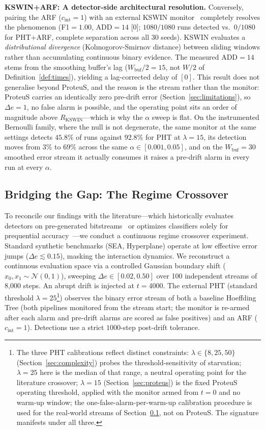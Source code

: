 \documentclass[smallextended]{svjour3}
\begin{document}
\textbf{KSWIN+ARF: A detector-side architectural resolution.}
Conversely, pairing the ARF ($c_{\mathrm{int}}=1$) with an external KSWIN monitor~\cite{raab_kswin_2020} completely resolves the phenomenon (F1${=}1.00$, ADD${=}14$ [0]; $1080/1080$ runs detected vs.\ $0/1080$ for PHT$+$ARF, complete separation across all 30 seeds). KSWIN evaluates a \emph{distributional divergence} (Kolmogorov-Smirnov distance) between sliding windows rather than accumulating continuous binary evidence. The measured ADD${=}14$ stems from the smoothing buffer's lag ($W_{\mathrm{buf}}/2=15$, not $W/2$ of Definition~\ref{def:times}), yielding a lag-corrected delay of $[0]$. This result does not generalise beyond ProteuS, and the reason is the stream rather than the monitor: ProteuS carries an identically zero pre-drift error (Section~\ref{sec:limitations}), so $\Delta e = 1$, no false alarm is possible, and the operating point sits an order of magnitude above $R_{\mathrm{KSWIN}}$---which is why the $\alpha$ sweep is flat. On the instrumented Bernoulli family, where the null is not degenerate, the same monitor at the same settings detects $45.8\%$ of runs against $92.8\%$ for PHT at $\lambda{=}15$, its detection moves from $3\%$ to $69\%$ across the same $\alpha \in [0.001, 0.05]$, and on the $W_{\mathrm{buf}}{=}30$ smoothed error stream it actually consumes it raises a pre-drift alarm in every run at every $\alpha$.

\subsection{Bridging the Gap: The Regime Crossover}\label{sec:crossover}

To reconcile our findings with the literature---which historically evaluates detectors on pre-generated bitstreams~\cite{goncalves_2014} or optimizes classifiers solely for prequential accuracy~\cite{gomes_arf_2017}---we conduct a continuous regime crossover experiment.
Standard synthetic benchmarks (SEA, Hyperplane) operate at low effective error jumps ($\Delta e \lesssim 0.15$), masking the interaction dynamics. We reconstruct a continuous evaluation space via a controlled Gaussian boundary shift ($x_0, x_1 \sim \mathcal{N}(0,1)$), sweeping $\Delta e \in[0.02, 0.50]$ over 100 independent streams of 8,000 steps. An abrupt drift is injected at $t{=}4000$. The external PHT (standard threshold $\lambda=25$\footnote{The three PHT calibrations reflect distinct constraints: $\lambda \in \{8, 25, 50\}$ (Section~\ref{sec:complexity}) probes the threshold-sensitivity of starvation; $\lambda = 25$ here is the median of that range, a neutral operating point for the literature crossover; $\lambda = 15$ (Section~\ref{sec:proteus}) is the fixed ProteuS operating threshold, applied with the monitor armed from $t{=}0$ and no warm-up window; the one-false-alarm-per-warm-up calibration procedure is used for the real-world streams of Section~\ref{sec:crossover}, not on ProteuS. The signature manifests under all three.}) observes the binary error stream of both a baseline Hoeffding Tree (both pipelines monitored from the stream start; the monitor is re-armed after each alarm and pre-drift alarms are scored as false positives) and an ARF ($c_{\mathrm{int}}=1$). Detections use a strict $1000$-step post-drift tolerance.
\end{document}
